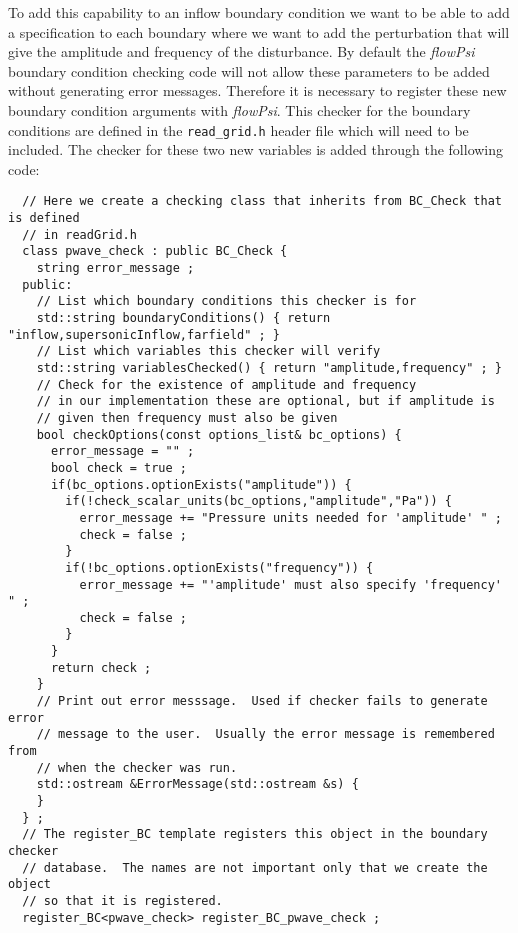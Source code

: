 \documentclass[letterpaper,twoside]{article}
\begin{document}
To add this capability to an inflow boundary condition we want to be
able to add a specification to each boundary where we want to add the
perturbation that will give the amplitude and frequency of the
disturbance.  By default the {\it flowPsi} boundary condition checking
code will not allow these parameters to be added without generating
error messages. Therefore it is necessary to register these new
boundary condition arguments with {\it flowPsi}.  This checker for the
boundary conditions are defined in the {\tt read\_grid.h} header file
which will need to be included.  The checker for these two new
variables is added through the following code:
\begin{verbatim}
  // Here we create a checking class that inherits from BC_Check that is defined
  // in readGrid.h
  class pwave_check : public BC_Check {
    string error_message ;
  public:
    // List which boundary conditions this checker is for
    std::string boundaryConditions() { return "inflow,supersonicInflow,farfield" ; }
    // List which variables this checker will verify
    std::string variablesChecked() { return "amplitude,frequency" ; }
    // Check for the existence of amplitude and frequency
    // in our implementation these are optional, but if amplitude is
    // given then frequency must also be given
    bool checkOptions(const options_list& bc_options) {
      error_message = "" ;
      bool check = true ;
      if(bc_options.optionExists("amplitude")) {
        if(!check_scalar_units(bc_options,"amplitude","Pa")) {
          error_message += "Pressure units needed for 'amplitude' " ;
          check = false ;
        }
        if(!bc_options.optionExists("frequency")) {
          error_message += "'amplitude' must also specify 'frequency' " ;
          check = false ;
        }
      }
      return check ;
    }
    // Print out error messsage.  Used if checker fails to generate error
    // message to the user.  Usually the error message is remembered from 
    // when the checker was run.
    std::ostream &ErrorMessage(std::ostream &s) {
    }
  } ;
  // The register_BC template registers this object in the boundary checker
  // database.  The names are not important only that we create the object
  // so that it is registered.
  register_BC<pwave_check> register_BC_pwave_check ;
\end{verbatim}
\end{document}
